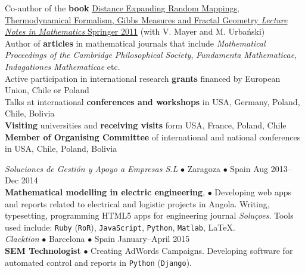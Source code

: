 \documentclass[a4paper, oneside]{scrreprt}
\begin{document}
\noindent\llap{\FA \faBook\ \ }Co-author of the \textbf{book} \href{http://www.amazon.com/Distance-Expanding-Thermodynamical-Formalism-Mathematics/dp/3642236499/ref=sr_1_1?s=books&ie=UTF8&qid=1410309067&sr=1-1}{Distance Expanding Random Mappings, Thermodynamical Formalism, Gibbs Measures and Fractal Geometry \textit{Lecture Notes in Mathematics} Springer 2011} (with V. Mayer and M. Urbański)\\
\noindent\llap{\FA \faPencil\ \ }Author of \textbf{articles} in 
mathematical journals that include  
\textit{Mathematical Proceedings of the Cambridge Philosophical Society}, \textit{Fundamenta Mathematicae}, \textit{Indagationes Mathematicae} etc.\\
\noindent\llap{\FA \faFlask\ \ }Active participation in international research \textbf{grants} financed by European Union, Chile or Poland\\
\noindent\llap{\FA \faBullhorn\ \ }Talks at international 
\textbf{conferences and workshops} in USA, Germany, Poland, 
Chile, Bolivia\\
\noindent\llap{\FA \faExchange\ \ }\textbf{Visiting} 
universities and \textbf{receiving visits} form USA, France, Poland, Chile\\
\noindent\llap{\FA \faCalendar\ \ }\textbf{Member of Organising Committee}
of international and national conferences in USA, Chile, Poland, Bolivia\\

\vspace{-0.3cm}
\noindent\makebox[\linewidth]{\rule{\textwidth}{0.4pt}}



\noindent{}\textit{Soluciones de Gestión y Apoyo a Empresas S.L} 
$\bullet$ Zaragoza $\bullet$ Spain \hfill Aug 2013--Dec 2014\\
\noindent\textbf{\small Mathematical modelling in electric engineering}, $\bullet$ 
{\small Developing web apps and reports related to electrical and
  logistic projects in Angola.  Writing, typesetting, programming
  HTML5 apps for engineering journal \emph{Soluçoes}.  Tools used
  include:
  \texttt{Ruby} (\texttt{RoR}), \texttt{JavaScript}, \texttt{Python}, \texttt{Matlab}, \LaTeX.}\\

\vspace{-0.3cm}
\noindent{}\textit{Clacktion} $\bullet$ 
Barcelona $\bullet$ Spain \hfill January--April 2015\\
\noindent\textbf{\small SEM Technologist} $\bullet$ Creating AdWords Campaigns.
Developing software for automated control and reports in \texttt{Python} (\texttt{Django}).\\ 

\vspace{-0.3cm}
\noindent\makebox[\linewidth]{\rule{\textwidth}{0.4pt}}
\end{document}

